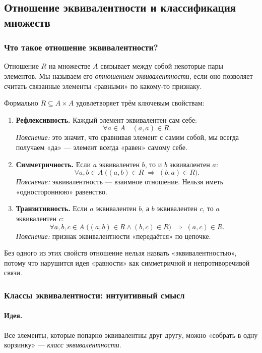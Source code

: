 \subsection{Отношение эквивалентности и классификация множеств}

\subsubsection{Что такое отношение эквивалентности?}

Отношение $R$ на множестве $A$ связывает между собой некоторые пары элементов.  
Мы называем его \emph{отношением эквивалентности}, если оно позволяет считать связанные элементы «равными» по какому‑то признаку.  

Формально $R\subseteq A\times A$ удовлетворяет трём ключевым свойствам:

\begin{enumerate}[label=\arabic*)]
  \item \textbf{Рефлексивность.}  
    Каждый элемент эквивалентен сам себе:
    \[
      \forall a\in A\quad (a,a)\in R.
    \]
    \emph{Пояснение:} это значит, что сравнивая элемент с самим собой, мы всегда получаем «да» — элемент всегда «равен» самому себе.

  \item \textbf{Симметричность.}  
    Если $a$ эквивалентен $b$, то и $b$ эквивалентен $a$:
    \[
      \forall a,b\in A\;\bigl((a,b)\in R \;\Rightarrow\; (b,a)\in R\bigr).
    \]
    \emph{Пояснение:} эквивалентность — взаимное отношение. Нельзя иметь «одностороннюю» равенство.

  \item \textbf{Транзитивность.}  
    Если $a$ эквивалентен $b$, а $b$ эквивалентен $c$, то $a$ эквивалентен $c$:
    \[
      \forall a,b,c\in A\;\bigl((a,b)\in R \wedge (b,c)\in R\bigr) \;\Rightarrow\; (a,c)\in R.
    \]
    \emph{Пояснение:} признак эквивалентности «передаётся» по цепочке.
\end{enumerate}

Без одного из этих свойств отношение нельзя назвать «эквивалентностью», потому что нарушится идея «равности» как симметричной и непротиворечивой связи.

\subsubsection{Классы эквивалентности: интуитивный смысл}

\paragraph{Идея.} Все элементы, которые попарно эквивалентны друг другу, можно «собрать в одну корзинку» — \emph{класс эквивалентности}.  

